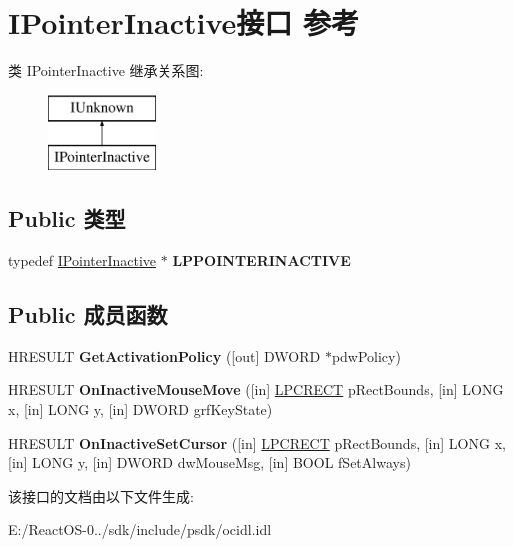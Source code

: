 \hypertarget{interface_i_pointer_inactive}{}\section{I\+Pointer\+Inactive接口 参考}
\label{interface_i_pointer_inactive}
类 I\+Pointer\+Inactive 继承关系图\+:\begin{figure}[H]
\begin{center}
\leavevmode
\includegraphics[height=2.000000cm]{interface_i_pointer_inactive}
\end{center}
\end{figure}
\subsection*{Public 类型}
\begin{DoxyCompactItemize}
\item 
\mbox{\label{interface_i_pointer_inactive_aaa2055701b6f400320725be8cb700082}} 
typedef \hyperlink{interface_i_pointer_inactive}{I\+Pointer\+Inactive} $\ast$ {\bfseries L\+P\+P\+O\+I\+N\+T\+E\+R\+I\+N\+A\+C\+T\+I\+VE}
\end{DoxyCompactItemize}
\subsection*{Public 成员函数}
\begin{DoxyCompactItemize}
\item 
\mbox{\label{interface_i_pointer_inactive_a2c9e89ce4c973a58a033a980c1e86e2b}} 
H\+R\+E\+S\+U\+LT {\bfseries Get\+Activation\+Policy} (\mbox{[}out\mbox{]} D\+W\+O\+RD $\ast$pdw\+Policy)
\item 
\mbox{\label{interface_i_pointer_inactive_adcaac743a4b7e9d32da99b30eaa43153}} 
H\+R\+E\+S\+U\+LT {\bfseries On\+Inactive\+Mouse\+Move} (\mbox{[}in\mbox{]} \hyperlink{structtag_r_e_c_t}{L\+P\+C\+R\+E\+CT} p\+Rect\+Bounds, \mbox{[}in\mbox{]} L\+O\+NG x, \mbox{[}in\mbox{]} L\+O\+NG y, \mbox{[}in\mbox{]} D\+W\+O\+RD grf\+Key\+State)
\item 
\mbox{\label{interface_i_pointer_inactive_ad9f2dcfa29e8e039fad9eeb58c8e9690}} 
H\+R\+E\+S\+U\+LT {\bfseries On\+Inactive\+Set\+Cursor} (\mbox{[}in\mbox{]} \hyperlink{structtag_r_e_c_t}{L\+P\+C\+R\+E\+CT} p\+Rect\+Bounds, \mbox{[}in\mbox{]} L\+O\+NG x, \mbox{[}in\mbox{]} L\+O\+NG y, \mbox{[}in\mbox{]} D\+W\+O\+RD dw\+Mouse\+Msg, \mbox{[}in\mbox{]} B\+O\+OL f\+Set\+Always)
\end{DoxyCompactItemize}


该接口的文档由以下文件生成\+:\begin{DoxyCompactItemize}
\item 
E\+:/\+React\+O\+S-\/0../sdk/include/psdk/ocidl.\+idl\end{DoxyCompactItemize}

